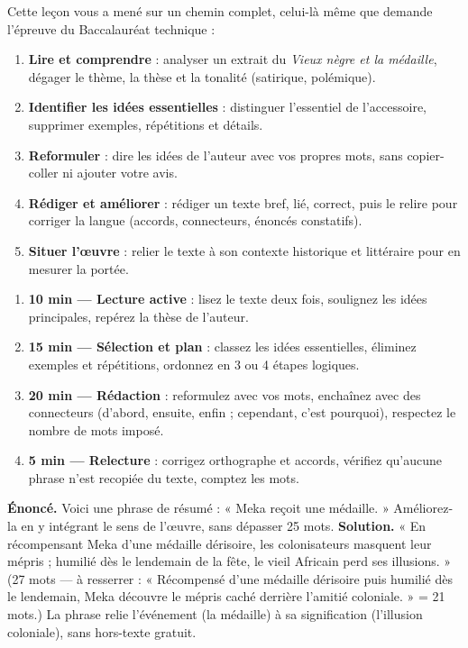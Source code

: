 \documentclass[11pt]{article}
\begin{document}
Cette leçon vous a mené sur un chemin complet, celui-là même que demande l'épreuve du Baccalauréat technique :

\begin{enumerate}
\item \textbf{Lire et comprendre} : analyser un extrait du \emph{Vieux nègre et la médaille}, dégager le thème, la thèse et la tonalité (satirique, polémique).
\item \textbf{Identifier les idées essentielles} : distinguer l'essentiel de l'accessoire, supprimer exemples, répétitions et détails.
\item \textbf{Reformuler} : dire les idées de l'auteur avec vos propres mots, sans copier-coller ni ajouter votre avis.
\item \textbf{Rédiger et améliorer} : rédiger un texte bref, lié, correct, puis le relire pour corriger la langue (accords, connecteurs, énoncés constatifs).
\item \textbf{Situer l'œuvre} : relier le texte à son contexte historique et littéraire pour en mesurer la portée.
\end{enumerate}

\begin{methode}
\begin{enumerate}
\item \textbf{10 min — Lecture active} : lisez le texte deux fois, soulignez les idées principales, repérez la thèse de l'auteur.
\item \textbf{15 min — Sélection et plan} : classez les idées essentielles, éliminez exemples et répétitions, ordonnez en 3 ou 4 étapes logiques.
\item \textbf{20 min — Rédaction} : reformulez avec vos mots, enchaînez avec des connecteurs (d'abord, ensuite, enfin ; cependant, c'est pourquoi), respectez le nombre de mots imposé.
\item \textbf{5 min — Relecture} : corrigez orthographe et accords, vérifiez qu'aucune phrase n'est recopiée du texte, comptez les mots.
\end{enumerate}
\end{methode}

\begin{exoresolu}
\textbf{Énoncé.} Voici une phrase de résumé : « Meka reçoit une médaille. » Améliorez-la en y intégrant le sens de l'œuvre, sans dépasser 25 mots.
\tcblower
\textbf{Solution.} « En récompensant Meka d'une médaille dérisoire, les colonisateurs masquent leur mépris ; humilié dès le lendemain de la fête, le vieil Africain perd ses illusions. » (27 mots — à resserrer : « Récompensé d'une médaille dérisoire puis humilié dès le lendemain, Meka découvre le mépris caché derrière l'amitié coloniale. » = 21 mots.) La phrase relie l'événement (la médaille) à sa signification (l'illusion coloniale), sans hors-texte gratuit.
\end{exoresolu}
\end{document}
